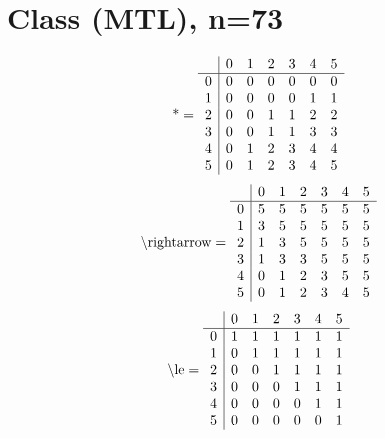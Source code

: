\documentclass[11pt]{article}
\begin{document}
\section{Class (MTL), n=73}
\[\text{*} = 
\begin{array}{r | r r r r r r}
 & 0 & 1 & 2 & 3 & 4 & 5 \\ \hline
0 & 0 & 0 & 0 & 0 & 0 & 0 \\
1 & 0 & 0 & 0 & 0 & 1 & 1 \\
2 & 0 & 0 & 1 & 1 & 2 & 2 \\
3 & 0 & 0 & 1 & 1 & 3 & 3 \\
4 & 0 & 1 & 2 & 3 & 4 & 4 \\
5 & 0 & 1 & 2 & 3 & 4 & 5 \\
\end{array}
\]
\[\text{\textbackslash rightarrow} = 
\begin{array}{r | r r r r r r}
 & 0 & 1 & 2 & 3 & 4 & 5 \\ \hline
0 & 5 & 5 & 5 & 5 & 5 & 5 \\
1 & 3 & 5 & 5 & 5 & 5 & 5 \\
2 & 1 & 3 & 5 & 5 & 5 & 5 \\
3 & 1 & 3 & 3 & 5 & 5 & 5 \\
4 & 0 & 1 & 2 & 3 & 5 & 5 \\
5 & 0 & 1 & 2 & 3 & 4 & 5 \\
\end{array}
\]
\[\text{\textbackslash le} = 
\begin{array}{r | r r r r r r}
 & 0 & 1 & 2 & 3 & 4 & 5 \\ \hline
0 & 1 & 1 & 1 & 1 & 1 & 1 \\
1 & 0 & 1 & 1 & 1 & 1 & 1 \\
2 & 0 & 0 & 1 & 1 & 1 & 1 \\
3 & 0 & 0 & 0 & 1 & 1 & 1 \\
4 & 0 & 0 & 0 & 0 & 1 & 1 \\
5 & 0 & 0 & 0 & 0 & 0 & 1 \\
\end{array}
\]
\end{document}
